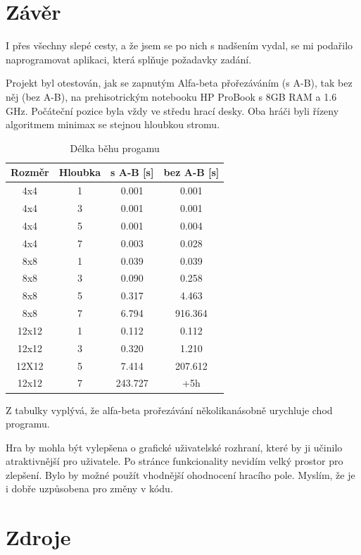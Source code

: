 \documentclass[
12pt,
a4paper,
pdftex,
czech,
titlepage
]{report}
\begin{document}
\chapter{Závěr}
I přes všechny slepé cesty, a že jsem se po nich s nadšením vydal, se mi podařilo naprogramovat aplikaci, která splňuje požadavky zadání.

Projekt byl otestován, jak se zapnutým Alfa-beta přořezáváním (s A-B), tak bez něj (bez A-B), na prehisotrickým notebooku HP ProBook s 8GB RAM a 1.6 GHz. Počáteční pozice byla vždy ve středu hrací desky. Oba hráči byli řízeny algoritmem minimax se stejnou hloubkou stromu.
\begin{table}[ht]
    \centering
    \begin{tabular}{|c|c|c|c|}
        \hline
        Rozměr &  Hloubka & s A-B [s] & bez A-B [s]\\
        \hline
          4x4& 1& 0.001& 0.001\\
          4x4& 3& 0.001& 0.001\\
          4x4& 5& 0.001& 0.004\\
          4x4& 7&  0.003& 0.028\\
          \hline
          8x8 & 1 & 0.039 & 0.039\\
          8x8 & 3 & 0.090 & 0.258 \\
          8x8 & 5 & 0.317 & 4.463 \\
          8x8 & 7 & 6.794 & 916.364  \\
          \hline
          12x12 & 1 & 0.112& 0.112\\
          12x12 & 3 & 0.320 & 1.210 \\
          12X12 & 5 & 7.414 & 207.612 \\
          12x12 & 7 & 243.727 & +5h \\
        \hline
    \end{tabular}
    \caption{Délka běhu progamu}
\label{tab:my_label}
\end{table}
\newline  Z tabulky vyplývá, že alfa-beta prořezávání několikanásobně urychluje chod programu. 

Hra by mohla být vylepšena o grafické uživatelské rozhraní, které by ji učinilo atraktivnější pro uživatele. Po stránce funkcionality nevidím velký prostor pro zlepšení. Bylo by možné použít vhodnější ohodnocení hracího pole. Myslím, že je i dobře uzpůsobena pro změny v kódu.

\chapter{Zdroje}
\end{document}
